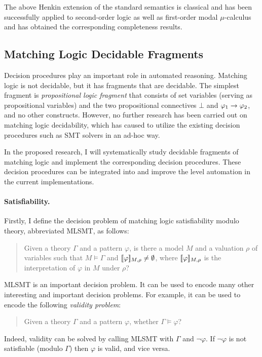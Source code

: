 \documentclass[11pt]{article}
\begin{document}
The above Henkin extension of the standard semantics is classical and has been 
successfully applied to second-order logic as well as first-order modal 
$\mu$-calculus and has obtained the corresponding completeness results. 




\subsection{Matching Logic Decidable Fragments}
\label{sec:proposed-decision}

Decision procedures play an important role in automated reasoning. 
Matching logic is not decidable, but it has fragments that are decidable.
The simplest fragment is \emph{propositional logic fragment}
that consists of set variables (serving as propositional variables)
and the two propositional connectives $\bot$ and $\varphi_1 \to \varphi_2$,
and no other constructs. 
However, no further research has been carried out on matching logic 
decidability, which has caused \K to utilize the existing decision procedures 
such as SMT solvers in an ad-hoc way. 

In the proposed research, I will systematically study decidable fragments of 
matching logic and implement the corresponding decision procedures. 
These decision procedures can be integrated into \K and improve the level 
automation in the current \K implementations. 

\paragraph{Satisfiability.}

Firstly, I define the decision problem of matching logic satisfiability modulo 
theory, abbreviated MLSMT, as follows:
\begin{quotation}
Given a theory $\Gamma$ and a pattern $\varphi$, is there a model $M$
and a valuation $\rho$ of variables such that
$M \vDash \Gamma$ and $[\![\varphi]\!]_{M,\rho} \neq \emptyset$, where
$[\![\varphi]\!]_{M,\rho}$ is the interpretation of $\varphi$ in $M$ under $\rho$?
\end{quotation}

MLSMT is an important decision problem. 
It can be used to encode many other interesting and important decision 
problems.
For example, it can be used to encode the following \emph{validity problem}:
\begin{quotation}
Given a theory $\Gamma$ and a pattern $\varphi$, whether $\Gamma \vDash 
\varphi$?
\end{quotation}
Indeed, validity can be solved by calling MLSMT with $\Gamma$ and $\neg 
\varphi$. If $\neg \varphi$ is not satisfiable (modulo $\Gamma$) then
$\varphi$ is valid, and vice versa. 
\end{document}
